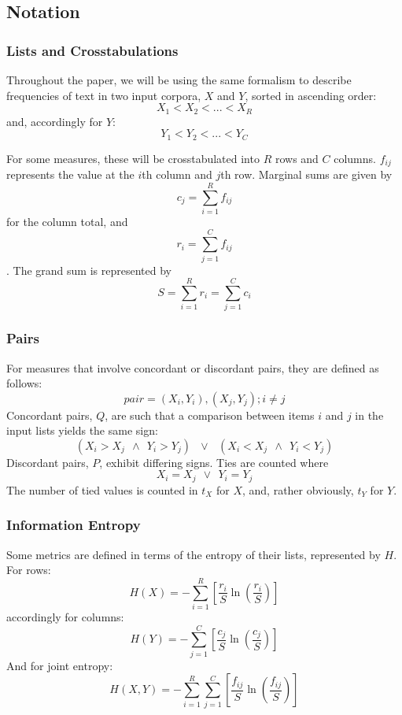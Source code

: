\documentclass[11pt]{article}
\begin{document}
\subsection{Notation}
\subsubsection{Lists and Crosstabulations}
Throughout the paper, we will be using the same formalism to describe frequencies of text in two input corpora, $X$ and $Y$, sorted in ascending order:
$$
X_1 < X_2 < ... < X_R
$$
and, accordingly for $Y$:
$$
Y_1 < Y_2 < ... < Y_C
$$


For some measures, these will be crosstabulated into $R$ rows and $C$ columns.  $f_{ij}$ represents the value at the $i$th column and $j$th row.  Marginal sums are given by 
$$ c_j = \sum_{i=1}^{R}f_{ij} $$ for the column total, and $$ r_i = \sum_{j=1}^{C}f_{ij} $$.  The grand sum is represented by $$S = \sum_{i=1}^{R}r_i = \sum_{j=1}^{C}c_i $$


\subsubsection{Pairs}
For measures that involve concordant or discordant pairs, they are defined as follows:
$$
pair = (X_i, Y_i), (X_j, Y_j); i \neq j
$$
Concordant pairs, $Q$, are such that a comparison between items $i$ and $j$ in the input lists yields the same sign:
$$
(X_i > X_j ~~\wedge~~ Y_i > Y_j)
~~~ \vee ~~~
(X_i < X_j ~~\wedge~~ Y_i < Y_j)
$$
Discordant pairs, $P$, exhibit differing signs.  Ties are counted where
$$
X_i = X_j ~~\vee~~ Y_i = Y_j
$$
The number of tied values is counted in $t_X$ for $X$, and, rather obviously, $t_Y$ for $Y$.

\subsubsection{Information Entropy}
Some metrics are defined in terms of the entropy of their lists, represented by $H$.  For rows:
$$
H(X) = -\sum_{i=1}^{R}{ \left[ \frac{ r_i }{ S }       \ln \left( \frac{ r_i }{ S } \right) \right] }
$$
accordingly for columns:
$$
H(Y) = -\sum_{j=1}^{C}{ \left[ \frac{ c_j }{ S }       \ln \left( \frac{ c_j }{ S } \right) \right] }
$$
And for joint entropy:
$$
H(X,Y) = -\sum_{i=1}^{R}{  \sum_{j=1}^{C}{ \left[    \frac{ f_{ij} }{S}  \ln \left( \frac{ f_{ij} }{ S } \right)     \right] } }
$$
\end{document}
